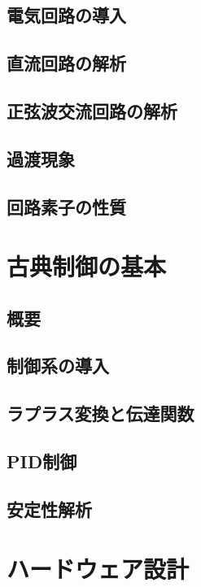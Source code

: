 \documentclass{ltjsreport}
\begin{document}
\section{電気回路の導入}

\section{直流回路の解析}

\section{正弦波交流回路の解析}

\section{過渡現象}

\section{回路素子の性質}




\chapter{古典制御の基本}

\section{概要}

\section{制御系の導入}

\section{ラプラス変換と伝達関数}

\section{PID制御}

\section{安定性解析}



\chapter{ハードウェア設計}
\end{document}
